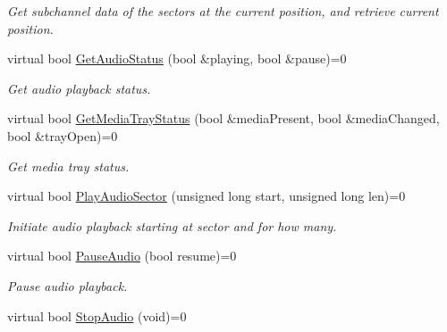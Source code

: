 \begin{DoxyCompactItemize}
\begin{DoxyCompactList}\small\item\em Get subchannel data of the sectors at the current position, and retrieve current position. \end{DoxyCompactList}\item 
\hypertarget{classCDROM__Interface_a5f5e3fd21c495a0a4f55e79b18b69729}{virtual bool \hyperlink{classCDROM__Interface_a5f5e3fd21c495a0a4f55e79b18b69729}{Get\-Audio\-Status} (bool \&playing, bool \&pause)=0}\label{classCDROM__Interface_a5f5e3fd21c495a0a4f55e79b18b69729}

\begin{DoxyCompactList}\small\item\em Get audio playback status. \end{DoxyCompactList}\item 
\hypertarget{classCDROM__Interface_a3891396e99454752aafc695813e495e8}{virtual bool \hyperlink{classCDROM__Interface_a3891396e99454752aafc695813e495e8}{Get\-Media\-Tray\-Status} (bool \&media\-Present, bool \&media\-Changed, bool \&tray\-Open)=0}\label{classCDROM__Interface_a3891396e99454752aafc695813e495e8}

\begin{DoxyCompactList}\small\item\em Get media tray status. \end{DoxyCompactList}\item 
\hypertarget{classCDROM__Interface_a9a90d8036bb0fccc17b147dfab6ad26f}{virtual bool \hyperlink{classCDROM__Interface_a9a90d8036bb0fccc17b147dfab6ad26f}{Play\-Audio\-Sector} (unsigned long start, unsigned long len)=0}\label{classCDROM__Interface_a9a90d8036bb0fccc17b147dfab6ad26f}

\begin{DoxyCompactList}\small\item\em Initiate audio playback starting at sector and for how many. \end{DoxyCompactList}\item 
\hypertarget{classCDROM__Interface_a811af8ad77b46c975473abd8aaa48f48}{virtual bool \hyperlink{classCDROM__Interface_a811af8ad77b46c975473abd8aaa48f48}{Pause\-Audio} (bool resume)=0}\label{classCDROM__Interface_a811af8ad77b46c975473abd8aaa48f48}

\begin{DoxyCompactList}\small\item\em Pause audio playback. \end{DoxyCompactList}\item 
\hypertarget{classCDROM__Interface_ac16f2f2a5f081fbd1ace3ae6af34b7c3}{virtual bool \hyperlink{classCDROM__Interface_ac16f2f2a5f081fbd1ace3ae6af34b7c3}{Stop\-Audio} (void)=0}\label{classCDROM__Interface_ac16f2f2a5f081fbd1ace3ae6af34b7c3}


\end{DoxyCompactItemize}
